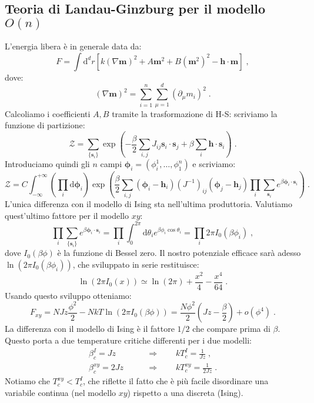 \documentclass[10pt,a4paper]{report}
\theoremstyle{definition}
\numberwithin{equation}{section}
\newcommand{\diff}[1][]{\mathrm{d}#1}
\newcommand{\zpart}{\mathcal{Z}}
\begin{document}
\subsection{Teoria di Landau-Ginzburg per il modello $O(n)$}
L'energia libera è in generale data da:
\begin{equation}
F=\int\diff^d{r}\left[k(\nabla\mathbf{m})^2+A\mathbf{m}^2+B(\mathbf{m}^2)^2-\mathbf{h}\cdot\mathbf{m}\right]\;,
\end{equation}
dove:
$$
(\nabla\mathbf{m})^2=\sum_{i=1}^n\sum_{\mu=1}^d(\partial_{\mu}m_i)^2\;.
$$
Calcoliamo i coefficienti $A,B$ tramite la trasformazione di H-S: scriviamo la funzione di partizione:
\begin{equation}
\zpart=\sum_{\{\mathbf{s}_i\}}\exp\left(-\frac{\beta}{2}\sum_{i,j}J_{ij}\mathbf{s}_i\cdot\mathbf{s}_j+\beta\sum_i\mathbf{h}\cdot \mathbf{s}_i\right)\;.
\end{equation}
Introduciamo quindi gli $n$ campi $\boldsymbol{\phi}_i=(\phi_i^1,\ldots,\phi_1^n)$ e scriviamo:
\begin{equation}
\zpart= C\int_{-\infty}^{+\infty}\left(\prod_i\diff{\boldsymbol{\phi}_i}\right)\exp\left(\frac{\beta}{2}\sum_{i,j}(\boldsymbol{\phi}_i-\mathbf{h}_i)(J^{-1})_{ij}(\boldsymbol{\phi}_j-\mathbf{h}_j)\prod_i\sum_{\mathbf{s}_i}e^{\beta\boldsymbol{\phi}_i\cdot\mathbf{s}_i}\right)\;.
\end{equation}
L'unica differenza con il modello di Ising sta nell'ultima produttoria. Valutiamo quest'ultimo fattore per il modello $xy$:
\begin{equation}
\prod_i\sum_{\{\mathbf{s}_i\}}e^{\beta\boldsymbol{\phi}_i\cdot\mathbf{s}_i}=\prod_i\int_0^{2\pi}\diff{\theta_i}e^{\beta\phi_i\cos\theta_i}=\prod_i2\pi I_0(\beta\phi_i)\;,
\end{equation}
dove $I_0(\beta\phi)$ è la funzione di Bessel zero. Il nostro potenziale efficace sarà adesso $\ln(2\pi I_0(\beta\phi_i))$, che sviluppato in serie restituisce:
\begin{equation}
\ln(2\pi I_0(x))\simeq \ln(2\pi)+\frac{x^2}{4}-\frac{x^4}{64}\;.
\end{equation}
Usando questo sviluppo otteniamo:
\begin{equation}
F_{xy}=NJz\frac{\phi^2}{2}-NkT\ln(2\pi I_0(\beta\phi))=\frac{N\phi^2}{2}\left(Jz-\frac{\beta}{2}\right)+o(\phi^4)\;.
\end{equation}
La differenza con il modello di Ising è il fattore $1/2$ che compare prima di $\beta$. Questo porta a due temperature critiche differenti per i due modelli:
\begin{align*}
\beta_c^I= Jz\qquad &\Longrightarrow \qquad kT_c^I=\frac{1}{Jz}\;, \\
\beta_c^{xy}=2Jz\qquad &\Longrightarrow\qquad kT_c^{xy}=\frac{1}{2Jz}\;.
\end{align*}
Notiamo che $T^{xy}_c<T^I_c$, che riflette il fatto che è più facile disordinare una variabile continua (nel modello $xy$) rispetto a una discreta (Ising).
\end{document}
